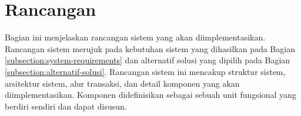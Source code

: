 \section{Rancangan}
\label{sec:rancangan}

Bagian ini menjelaskan rancangan sistem yang akan diimplementasikan. Rancangan sistem merujuk pada kebutuhan sistem yang dihasilkan pada Bagian \ref{subsection:system-requirements} dan alternatif solusi yang dipilih pada Bagian \ref{subsection:alternatif-solusi}. Rancangan sistem ini mencakup struktur sistem, arsitektur sistem, alur transaksi, dan detail komponen yang akan diimplementasikan. Komponen didefinisikan sebagai sebuah unit fungsional yang berdiri sendiri dan dapat disusun.







